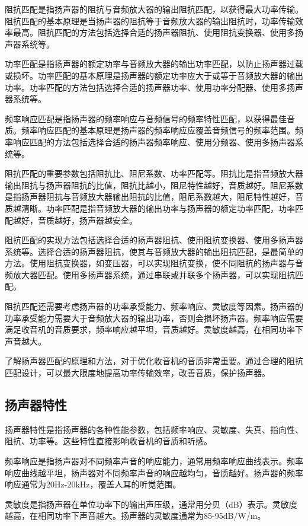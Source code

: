 \documentclass[12pt,UTF8]{ctexbook}
\begin{document}
阻抗匹配是指扬声器的阻抗与音频放大器的输出阻抗匹配，以获得最大功率传输。阻抗匹配的基本原理是当扬声器的阻抗等于音频放大器的输出阻抗时，功率传输效率最高。阻抗匹配的方法包括选择合适的扬声器阻抗、使用阻抗变换器、使用多扬声器系统等。

功率匹配是指扬声器的额定功率与音频放大器的输出功率匹配，以防止扬声器过载或损坏。功率匹配的基本原理是扬声器的额定功率应大于或等于音频放大器的输出功率。功率匹配的方法包括选择合适的扬声器功率、使用功率分配器、使用多扬声器系统等。

频率响应匹配是指扬声器的频率响应与音频信号的频率特性匹配，以获得最佳音质。频率响应匹配的基本原理是扬声器的频率响应应覆盖音频信号的频率范围。频率响应匹配的方法包括选择合适的扬声器频率响应、使用分频器、使用多扬声器系统等。

阻抗匹配的重要参数包括阻抗比、阻尼系数、功率匹配等。阻抗比是指音频放大器输出阻抗与扬声器阻抗的比值，阻抗比越小，阻尼特性越好，音质越好。阻尼系数是指扬声器阻抗与音频放大器输出阻抗的比值，阻尼系数越大，阻尼特性越好，音质越清晰。功率匹配是指音频放大器的输出功率与扬声器的额定功率匹配，功率匹配越好，音质越好，扬声器越安全。

阻抗匹配的实现方法包括选择合适的扬声器阻抗、使用阻抗变换器、使用多扬声器系统等。选择合适的扬声器阻抗，使其与音频放大器的输出阻抗匹配，是最简单的方法。使用阻抗变换器，如变压器，可以实现阻抗变换，使不同阻抗的扬声器与音频放大器匹配。使用多扬声器系统，通过串联或并联多个扬声器，可以实现阻抗匹配。

阻抗匹配还需要考虑扬声器的功率承受能力、频率响应、灵敏度等因素。扬声器的功率承受能力需要大于音频放大器的输出功率，否则会损坏扬声器。频率响应需要满足收音机的音质要求，频率响应越平坦，音质越好。灵敏度越高，在相同功率下声音越大。

了解扬声器匹配的原理和方法，对于优化收音机的音质非常重要。通过合理的阻抗匹配设计，可以最大限度地提高功率传输效率，改善音质，保护扬声器。

\subsection{扬声器特性}

扬声器特性是指扬声器的各种性能参数，包括频率响应、灵敏度、失真、指向性、阻抗、功率等。这些特性直接影响收音机的音质和听感。

频率响应是指扬声器对不同频率声音的响应能力，通常用频率响应曲线表示。频率响应曲线越平坦，扬声器对不同频率声音的响应越均匀，音质越好。扬声器的频率响应通常为20Hz-20kHz，覆盖人耳的听觉范围。

灵敏度是指扬声器在单位功率下的输出声压级，通常用分贝（dB）表示。灵敏度越高，在相同功率下声音越大。扬声器的灵敏度通常为85-95dB/W/m。
\end{document}
